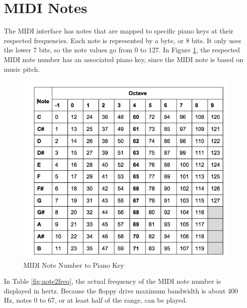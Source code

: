 \documentclass[11pt, a4paper]{report}
\begin{document}
\section{MIDI Notes}

The MIDI interface has notes that are mapped to specific piano keys at their respected frequencies. Each note is represented by a byte, or 8 bits. It only uses the lower 7 bits, so the note values go from 0 to 127. In Figure \ref{fig:Piano}, the respected MIDI note number has an associated piano key, since the MIDI note is based on music pitch. 

\begin{figure}[H]
\hspace*{-2cm}    
    \centering
    \includegraphics[width=.75\textwidth]{midi_notechart.jpg}
    \caption{MIDI Note Number to Piano Key}
    \label{fig:Piano}
\end{figure}

In Table \ref{fig:note2freq}, the actual frequency of the MIDI note number is displayed in hertz. Because the floppy drive maximum bandwidth is about 400 Hz, notes 0 to 67, or at least half of the range, can be played.
\end{document}
